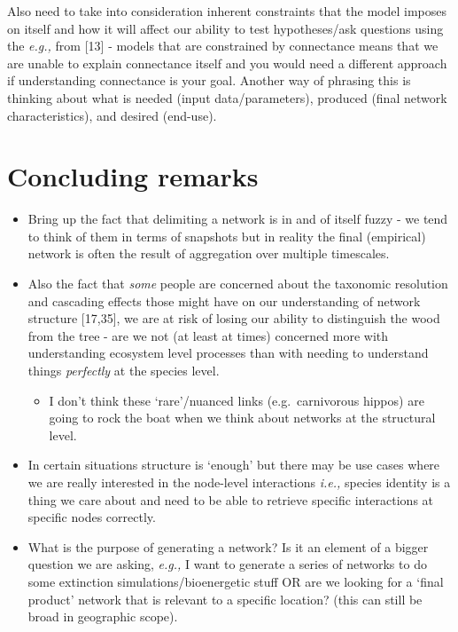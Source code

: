 \documentclass[
]{article}
\providecommand{\tightlist}{%
  \setlength{\itemsep}{0pt}\setlength{\parskip}{0pt}}\usepackage{longtable,booktabs,array}
\begin{document}
\begin{tcolorbox}
Also need to take into consideration inherent constraints that the model
imposes on itself and how it will affect our ability to test
hypotheses/ask questions using the \emph{e.g.,} from {[}13{]} - models
that are constrained by connectance means that we are unable to explain
connectance itself and you would need a different approach if
understanding connectance is your goal. Another way of phrasing this is
thinking about what is needed (input data/parameters), produced (final
network characteristics), and desired (end-use).

\end{tcolorbox}

\section{Concluding remarks}\label{concluding-remarks}

\begin{itemize}
\item
  Bring up the fact that delimiting a network is in and of itself fuzzy
  - we tend to think of them in terms of snapshots but in reality the
  final (empirical) network is often the result of aggregation over
  multiple timescales.
\item
  Also the fact that \emph{some} people are concerned about the
  taxonomic resolution and cascading effects those might have on our
  understanding of network structure {[}17,35{]}, we are at risk of
  losing our ability to distinguish the wood from the tree - are we not
  (at least at times) concerned more with understanding ecosystem level
  processes than with needing to understand things \emph{perfectly} at
  the species level.

  \begin{itemize}
  \tightlist
  \item
    I don't think these `rare'/nuanced links (e.g.~carnivorous hippos)
    are going to rock the boat when we think about networks at the
    structural level.
  \end{itemize}
\item
  In certain situations structure is `enough' but there may be use cases
  where we are really interested in the node-level interactions
  \emph{i.e.,} species identity is a thing we care about and need to be
  able to retrieve specific interactions at specific nodes correctly.
\item
  What is the purpose of generating a network? Is it an element of a
  bigger question we are asking, \emph{e.g.,} I want to generate a
  series of networks to do some extinction simulations/bioenergetic
  stuff OR are we looking for a `final product' network that is relevant
  to a specific location? (this can still be broad in geographic scope).
\end{itemize}
\end{document}
